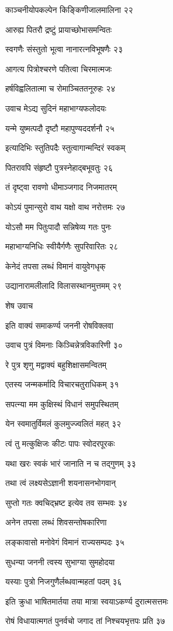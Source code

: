 काञ्चनीयोपकल्पेन किङ्किणीजालमालिना २२

आरुह्य पितरौ द्रष्टुं प्रायाच्छोभासमन्वितः

स्वगणैः संस्तुतो भूत्वा नानारत्नविभूषणैः २३

आगत्य पित्रोश्चरणे पतित्वा चिरमात्मजः

हर्षविह्वलितात्मा च रोमाञ्चिततनूरुहः २४

उवाच मेऽद्य सुदिनं महाभाग्यफलोदयः

यन्मे युष्मत्पदौ दृष्टौ महापुण्यददर्शनौ २५

इत्यादिभिः स्तुतिपदैः स्तुत्वागान्मन्दिरं स्वकम्

पितरावपि संहृष्टौ पुत्रस्नेहाद्बभूवतुः २६

तं दृष्ट्वा रावणो धीमाञ्जगाद निजमातरम्

कोऽयं पुमान्सुरो वाथ यक्षो वाथ नरोत्तमः २७

योऽसौ मम पितुःपादौ सन्निषेव्य गतः पुनः

महाभाग्यनिधिः स्वीयैर्गणैः सुपरिवारितः २८

केनेदं तपसा लब्धं विमानं वायुवेगधृक्

उद्यानारामलीलादि विलासस्थानमुत्तमम् २९

शेष उवाच

इति वाक्यं समाकर्ण्य जननी रोषविक्लवा

उवाच पुत्रं विमनाः किञ्चिन्नेत्रविकारिणी ३०

रे पुत्र शृणु मद्वाक्यं बहुशिक्षासमन्वितम्

एतस्य जन्मकर्मादि विचारचतुराधिकम् ३१

सपत्न्या मम कुक्षिस्थं विधानं समुपस्थितम्

येन स्वमातुर्विमलं कुलमुज्ज्वलितं महत् ३२

त्वं तु मत्कुक्षिजः कीटः पापः स्वोदरपूरकः

यथा खरः स्वकं भारं जानाति न च तद्गुणम् ३३

तथा त्वं लक्ष्यसेऽज्ञानी शयनासनभोगवान्

सुप्तो गतः क्वचिद्भ्रष्ट इत्येव तव सम्भवः ३४

अनेन तपसा लब्धं शिवसन्तोषकारिणा

लङ्कावासो मनोवेगं विमानं राज्यसम्पदः ३५

सुधन्या जननी त्वस्य सुभाग्या सुमहोदया

यस्याः पुत्रो निजगुणैर्लब्धवान्महतां पदम् ३६

इति क्रुधा भाषितमार्तया तया मात्रा स्वयाऽकर्ण्य दुरात्मसत्तमः

रोषं विधायात्मगतं पुनर्वचो जगाद तां निश्चयभृत्तपः प्रति ३७

